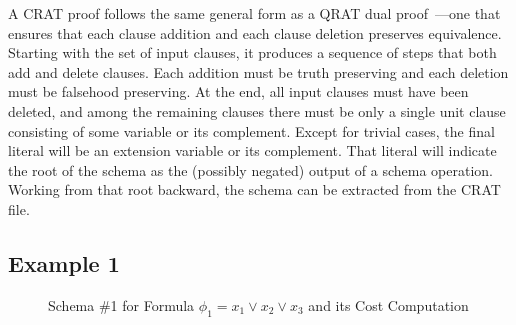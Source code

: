 \documentclass{llncs}
\begin{document}
A CRAT proof follows the same general form as a QRAT dual proof~\cite{bryant:cade:2021}---one
that ensures that each clause addition and each clause deletion
preserves equivalence.  Starting with the set of input clauses, it
produces a sequence of steps that both add and delete clauses.  Each
addition must be truth preserving and each deletion must be falsehood
preserving.  At the end, all input clauses must have been deleted, and
among the remaining clauses there must be only a single unit clause
consisting of some variable or its complement.  Except for trivial
cases, the final literal will be an extension variable or its
complement.  That literal will indicate the root of the schema as the
(possibly negated) output of a schema operation.  Working from that
root backward, the schema can be extracted from the CRAT file.

\subsection{Example 1}

\begin{figure}
\caption{Schema \#1 for Formula $\phi_1 = x_1 \lor x_2 \lor x_3$ and its Cost Computation}
\label{fig:c3:schema}
\end{figure}
\end{document}
